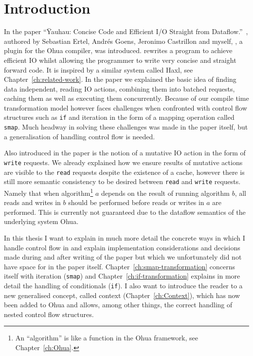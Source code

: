 \chapter{Introduction}

\label{ch:Intro}



In the paper ``Ÿauhau: Concise Code and Efficient I/O Straight from Dataflow.''~\cite{ErtelGoensAdamEtAl2016}, authored by Sebastian Ertel, Andrés Goens, Jeronimo Castrillon and myself, \yauhau{}, a plugin for the Ohua\cite{Ertel:2015:OID:2807426.2807431}\cite{Ohua:library:link} compiler, was introduced.
\yauhau{} rewrites a program to achieve efficient IO whilst allowing the programmer to write very concise and straight forward code.
It is inspired by a similar system called Haxl, see Chapter~\ref{ch:related-work}.
In the paper we explained the basic idea of finding data independent, reading IO actions, combining them into batched requests, caching them as well as executing them concurrently.
Because of our compile time transformation model however \yauhau{} faces challenges when confronted with control flow structures such as \texttt{if} and iteration in the form of a mapping operation called \texttt{smap}.
Much headway in solving these challenges was made in the paper itself, but a generalisation of handling control flow is needed.

Also introduced in the paper is the notion of a mutative IO action in the form of \texttt{write} requests.
We already explained how we ensure results of mutative actions are visible to the \texttt{read} requests despite the existence of a cache, however there is still more semantic consistency to be desired between \texttt{read} and \texttt{write} requests.
Namely that when algorithm\footnote{An ``algorithm'' is like a function in the Ohua framework, see Chapter~\ref{ch:Ohua}.} $a$ depends on the result of running algorithm $b$, all reads and writes in $b$ should be performed before reads or writes in $a$ are performed.
This is currently not guaranteed due to the dataflow semantics of the underlying system Ohua.

In this thesis I want to explain in much more detail the concrete ways in which I handle control flow in \yauhau{} and explain implementation considerations and decisions made during and after writing of the paper but which we unfortunately did not have space for in the paper itself.
Chapter~\ref{ch:smap-transformation} concerns itself with iteration (\texttt{smap}) and Chapter~\ref{ch:if-transformation} explains in more detail the handling of conditionals (\texttt{if}).
I also want to introduce the reader to a new generalised concept, called context (Chapter~\ref{ch:Context}), which has now been added to Ohua and allows, among other things, the correct handling of nested control flow structures.

